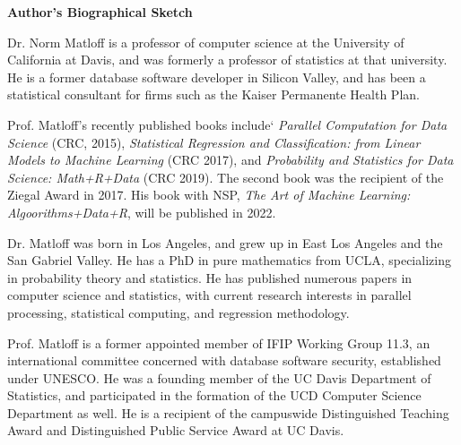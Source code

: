 \begin{center}
{\bf Author's Biographical Sketch}
\end{center} 

Dr. Norm Matloff is a professor of computer science at the University of
California at Davis, and was formerly a professor of statistics at that
university. He is a former database software developer in Silicon
Valley, and has been a statistical consultant for firms such as the
Kaiser Permanente Health Plan.

Prof. Matloff's recently published books include` \textit{Parallel
Computation for Data Science} (CRC, 2015), \textit{Statistical
Regression and Classification: from Linear Models to Machine Learning}
(CRC 2017), and \textit{Probability and Statistics for Data Science:
Math+R+Data} (CRC 2019).  The second book was the recipient of the
Ziegal Award in 2017.  His book with NSP, 
\textit{The Art of Machine Learning: Algoorithms+Data+R}, will be
published in 2022.

Dr. Matloff was born in Los Angeles, and grew up in East Los Angeles and
the San Gabriel Valley. He has a PhD in pure mathematics from UCLA,
specializing in probability theory and statistics.  He has published
numerous papers in computer science and statistics, with current
research interests in parallel processing, statistical computing,
and regression methodology.

Prof. Matloff is a former appointed member of IFIP Working Group 11.3,
an international committee concerned with database software security,
established under UNESCO.  He was a founding member of the UC Davis
Department of Statistics, and participated in the formation of the UCD
Computer Science Department as well.  He is a recipient of the
campuswide Distinguished Teaching Award and Distinguished Public Service
Award at UC Davis.

